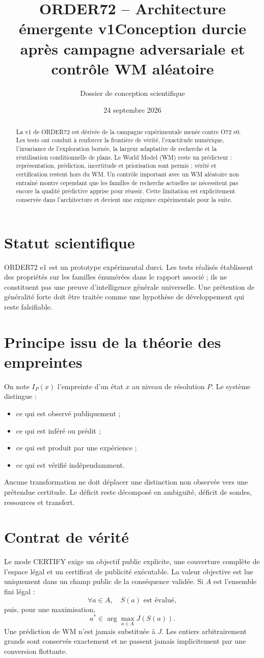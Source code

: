 \documentclass[11pt,a4paper]{article}
\title{ORDER72 -- Architecture émergente v1\newline\large Conception durcie après campagne adversariale et contrôle WM aléatoire}
\author{Dossier de conception scientifique}
\date{24 septembre 2026}
\begin{document}
\maketitle
\begin{abstract}
La v1 de ORDER72 est dérivée de la campagne expérimentale menée contre O72 e0. Les tests ont conduit à renforcer la frontière de vérité, l'exactitude numérique, l'invariance de l'exploration bornée, la largeur adaptative de recherche et la réutilisation conditionnelle de plans. Le World Model (WM) reste un prédicteur : représentation, prédiction, incertitude et priorisation sont permis ; vérité et certification restent hors du WM. Un contrôle important avec un WM aléatoire non entraîné montre cependant que les familles de recherche actuelles ne nécessitent pas encore la qualité prédictive apprise pour réussir. Cette limitation est explicitement conservée dans l'architecture et devient une exigence expérimentale pour la suite.
\end{abstract}
\tableofcontents
\section{Statut scientifique}
ORDER72 e1 est un prototype expérimental durci. Les tests réalisés établissent des propriétés sur les familles énumérées dans le rapport associé ; ils ne constituent pas une preuve d'intelligence générale universelle. Une prétention de généralité forte doit être traitée comme une hypothèse de développement qui reste falsifiable.
\section{Principe issu de la théorie des empreintes}
On note $I_P(x)$ l'empreinte d'un état $x$ au niveau de résolution $P$. Le système distingue :
\begin{itemize}
\item ce qui est observé publiquement ;
\item ce qui est inféré ou prédit ;
\item ce qui est produit par une expérience ;
\item ce qui est vérifié indépendamment.
\end{itemize}
Aucune transformation ne doit déplacer une distinction non observée vers une prétendue certitude. Le déficit reste décomposé en ambiguïté, déficit de sondes, ressources et transfert.
\section{Contrat de vérité}
Le mode CERTIFY exige un objectif public explicite, une couverture complète de l'espace légal et un certificat de publicité exécutable. La valeur objective est lue uniquement dans un champ public de la conséquence validée. Si $A$ est l'ensemble fini légal :
\[
\forall a\in A,\quad S(a)\text{ est évalué},
\]
puis, pour une maximisation,
\[
a^*\in\arg\max_{a\in A}J(S(a)).
\]
Une prédiction de WM n'est jamais substituée à $J$. Les entiers arbitrairement grands sont conservés exactement et ne passent jamais implicitement par une conversion flottante.
\end{document}
